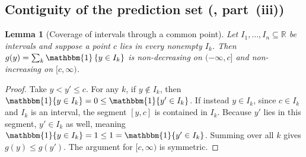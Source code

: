 \documentclass[twoside]{article}
\numberwithin{equation}{section}
\theoremstyle{plain}
\newtheorem{lemma}[theorem]{Lemma}
\theoremstyle{definition}
\theoremstyle{remark}
\newcommand{\set}[1]{\left\{#1\right\}}
\begin{document}
\subsection{Contiguity of the prediction set (, part~(iii))}\label{app:reg-contiguity}

\begin{lemma}[Coverage of intervals through a common point]\label{lem:quasiconcave}
Let $I_1, \dots, I_n \subseteq \mathbb{R}$ be intervals and suppose a point $c$
lies in every nonempty $I_k$. Then $g(y) = \sum_k \mathbbm{1}\set{y \in I_k}$
is non-decreasing on $(-\infty, c]$ and non-increasing on $[c, \infty)$.
\end{lemma}

\begin{proof}
Take $y < y' \le c$. For any $k$, if $y \notin I_k$, then $\mathbbm{1}\{y \in I_k\} = 0 \le \mathbbm{1}\{y' \in I_k\}$. If instead $y \in I_k$, since $c \in I_k$ and $I_k$ is an interval, the segment $[y, c]$ is contained in $I_k$. Because $y'$ lies in this segment, $y' \in I_k$ as well, meaning $\mathbbm{1}\{y \in I_k\} = 1 \le 1 = \mathbbm{1}\{y' \in I_k\}$. Summing over all $k$ gives $g(y) \le g(y')$. The argument for $[c, \infty)$ is symmetric.
\end{proof}
\end{document}
